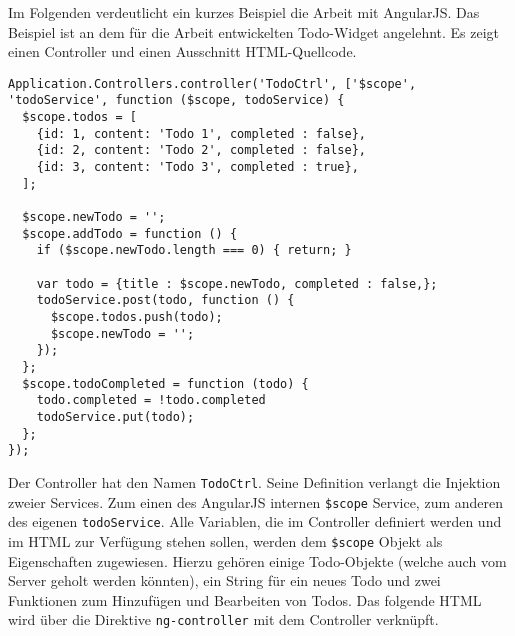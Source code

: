 Im Folgenden verdeutlicht ein kurzes Beispiel die Arbeit mit AngularJS. Das Beispiel ist an dem für die Arbeit entwickelten Todo-Widget angelehnt. Es zeigt einen Controller und einen Ausschnitt HTML-Quellcode.

\begin{lstlisting}
Application.Controllers.controller('TodoCtrl', ['$scope', 'todoService', function ($scope, todoService) {
  $scope.todos = [
    {id: 1, content: 'Todo 1', completed : false},
    {id: 2, content: 'Todo 2', completed : false},
    {id: 3, content: 'Todo 3', completed : true},
  ];
  
  $scope.newTodo = '';
  $scope.addTodo = function () {
    if ($scope.newTodo.length === 0) { return; }

    var todo = {title : $scope.newTodo, completed : false,};
    todoService.post(todo, function () {
      $scope.todos.push(todo);
      $scope.newTodo = '';
    });
  };
  $scope.todoCompleted = function (todo) {
    todo.completed = !todo.completed
    todoService.put(todo);
  };
});
\end{lstlisting}
Der Controller hat den Namen \texttt{TodoCtrl}. Seine Definition verlangt die Injektion zweier Services. Zum einen des AngularJS internen \texttt{\$scope} Service, zum anderen des eigenen \texttt{todoService}. Alle Variablen, die im Controller definiert werden und im HTML zur Verfügung stehen sollen, werden dem \texttt{\$scope} Objekt als Eigenschaften zugewiesen. Hierzu gehören einige Todo-Objekte (welche auch vom Server geholt werden könnten), ein String für ein neues Todo und zwei Funktionen zum Hinzufügen und Bearbeiten von Todos. Das folgende HTML wird über die Direktive \texttt{ng-controller} mit dem Controller verknüpft.

